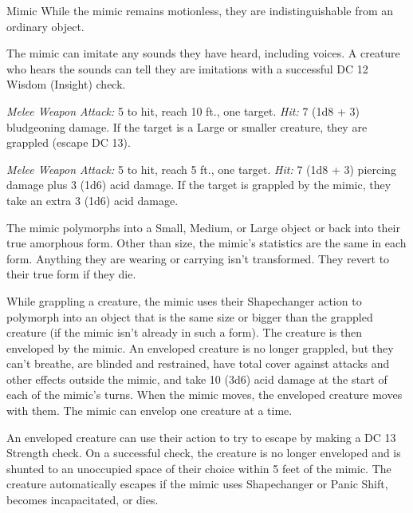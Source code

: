 \documentclass[10pt,a4paper,twoside,bg=print,twocolumn,openany,nodeprecatedcode]{dndbook}
\begin{document}
\begin{DndMonster}[float=t]{Mimic}
\DndMonsterBasics[
armor-class = {11},
hit-points = {\DndDice{10d8 + 20}},
speed = {15 ft., climb 15 ft.}
]
\DndMonsterAbilityScores[
 str = 17,
 dex = 12,
 con = 15,
 int = 5,
 wis = 12,
 cha = 10
]
\DndMonsterDetails[
skills = {Deception +2, Stealth +5},
damage-immunities = {acid; bludgeoning damage from falling},
condition-immunities = {prone},
senses = {darkvision 60 ft., passive perception 11},
challenge = 2,
]
While the mimic remains motionless, they are indistinguishable from an ordinary object.

The mimic can imitate any sounds they have heard, including voices. A creature who hears the sounds can tell they are imitations with a successful DC 12 Wisdom (Insight) check.

\textsl{Melee Weapon Attack:} 5 to hit, reach 10 ft., one target. \textsl{Hit:} 7 (1d8 + 3) bludgeoning damage. If the target is a Large or smaller creature, they are grappled (escape DC 13).

\textsl{Melee Weapon Attack:} 5 to hit, reach 5 ft., one target. \textsl{Hit:} 7 (1d8 + 3) piercing damage plus 3 (1d6) acid damage. If the target is grappled by the mimic, they take an extra 3 (1d6) acid damage.

The mimic polymorphs into a Small, Medium, or Large object or back into their true amorphous form. Other than size, the mimic's statistics are the same in each form. Anything they are wearing or carrying isn't transformed. They revert to their true form if they die.

While grappling a creature, the mimic uses their Shapechanger action to polymorph into an object that is the same size or bigger than the grappled creature (if the mimic isn't already in such a form). The creature is then enveloped by the mimic. An enveloped creature is no longer grappled, but they can't breathe, are blinded and restrained, have total cover against attacks and other effects outside the mimic, and take 10 (3d6) acid damage at the start of each of the mimic's turns. When the mimic moves, the enveloped creature moves with them. The mimic can envelop one creature at a time.

An enveloped creature can use their action to try to escape by making a DC 13 Strength check. On a successful check, the creature is no longer enveloped and is shunted to an unoccupied space of their choice within 5 feet of the mimic. The creature automatically escapes if the mimic uses Shapechanger or Panic Shift, becomes incapacitated, or dies.


\end{DndMonster}
\end{document}
